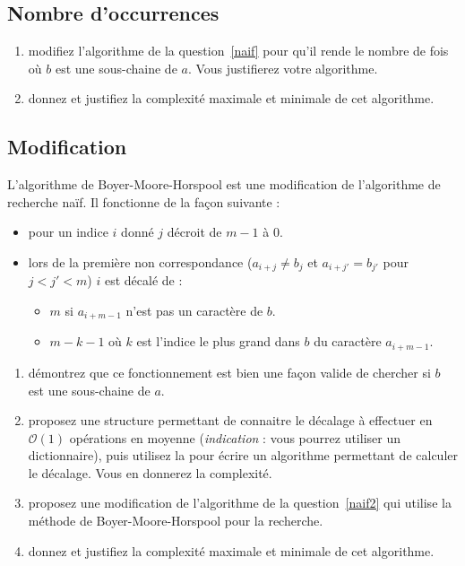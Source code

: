 \documentclass
[12pt]
{article}
\begin{document}
\subsection{Nombre d'occurrences\label{naif2}}

\begin{enumerate}
    \item modifiez l'algorithme de la question~\ref{naif} pour qu'il rende le nombre de fois où $b$ est une sous-chaine de $a$. Vous justifierez votre algorithme.
    \item donnez et justifiez la complexité maximale et minimale de cet algorithme.
\end{enumerate}

\subsection{Modification}

L'algorithme de Boyer-Moore-Horspool est une modification de l'algorithme de recherche naïf. Il fonctionne de la façon suivante :

\begin{itemize}
    \item pour un indice $i$ donné $j$ décroit de $m-1$ à $0$.
    \item lors de la première non correspondance ($a_{i + j} \neq b_j$ et $a_{i + j'} = b_{j'}$ pour $j < j' < m$) $i$ est décalé de :
    \begin{itemize}
        \item $m$ si $a_{i +m-1}$ n'est pas un caractère de $b$.
        \item $m-k-1$ où $k$ est l'indice le plus grand dans $b$ du caractère $a_{i + m -1}$.
    \end{itemize}
\end{itemize}

\begin{enumerate}
    \item démontrez que ce fonctionnement est bien une façon valide de chercher si $b$ est une sous-chaine de $a$.
    \item proposez une structure permettant de connaitre le décalage à effectuer en $\mathcal{O}(1)$ opérations en moyenne ({\em indication} : vous pourrez utiliser un dictionnaire), puis utilisez la pour écrire un algorithme permettant de calculer le décalage. Vous en donnerez la complexité.
    \item proposez une modification de l'algorithme de la question~\ref{naif2} qui utilise la méthode de Boyer-Moore-Horspool pour la recherche.
    \item donnez et justifiez la complexité maximale et minimale de cet algorithme.
\end{enumerate}
\end{document}
